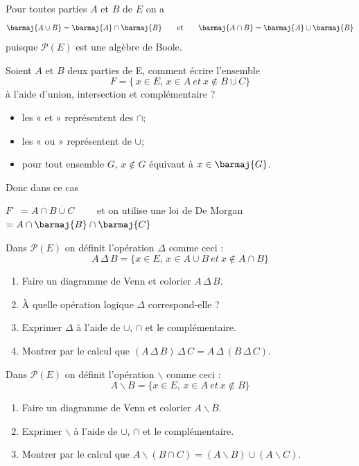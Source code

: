 \begin{propriete}
    Pour toutes parties $A$ et $B$ de $E$ on a
    $$\barmaj{A\cup B}=\barmaj{A}\cap\barmaj{B}\qquad\text{et}\qquad\barmaj{A\cap B}=\barmaj{A}\cup\barmaj{B}$$
    puisque  $\mathcal{P}(E)$  est une algèbre de Boole.
\end{propriete}
\begin{methode}[]
    Soient $A$ et $B$ deux parties de E, comment écrire l'ensemble $$F=\lbrace \,x\in E,\,x\in A\:et\:x\notin B\cup C\rbrace$$
    à l'aide d'union, intersection et complémentaire ?\\

    \begin{itemize}
        \item 	les « et »  représentent des $\cap$;
        \item 	les « ou »  représentent de $\cup$;
        \item 	pour tout ensemble $G$, $x\notin G$ équivaut à $x\in\barmaj{G}$.
    \end{itemize}

    Donc dans ce cas
    \begin{tabbing}
        $F$ \= $=A\cap\overline{B\cup C}\qquad$ et on utilise une loi de De Morgan\\
        \> $=A\cap \barmaj{B}\cap \barmaj{C}$
    \end{tabbing}
\end{methode}

\begin{exercice}[]
    Dans $\mathcal{P}(E)$ on définit l'opération $\Delta$ comme ceci :
    $$A\,\Delta\,B=\lbrace x\in E,\, x\in A\cup B\:et\:x\notin{A\cap B}\rbrace$$
    \begin{enumerate}
        \item 	Faire un diagramme de Venn et colorier $A\,\Delta\,B$.
        \item 	À quelle opération logique $\Delta$ correspond-elle ?
        \item 	Exprimer $\Delta$ à l'aide de $\cup$, $\cap$ et le complémentaire.
        \item 	Montrer par le calcul que $(A\,\Delta\,B)\,\Delta\,C =A\,\Delta\,(B\,\Delta\,C)$.
    \end{enumerate}
\end{exercice}

\begin{exercice}[]
    Dans $\mathcal{P}(E)$ on définit l'opération $\backslash$ comme ceci :
    $$A\backslash B=\lbrace x\in E,\, x\in A\:et\:x\notin B\rbrace$$
    \begin{enumerate}
        \item 	Faire un diagramme de Venn et colorier $A\backslash B$.
        \item 	Exprimer $\backslash$ à l'aide de $\cup$, $\cap$ et le complémentaire.
        \item 	Montrer par le calcul que $A\backslash (B\cap C)=(A\backslash B)\cup(A\backslash C)$.
    \end{enumerate}
\end{exercice}




